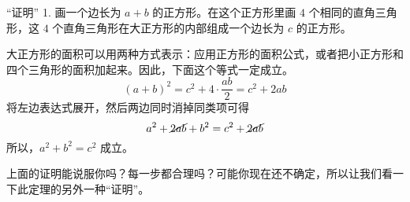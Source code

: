 \begin{proofs}{``证明'' 1.}
    画一个边长为 $a+b$ 的正方形。在这个正方形里画 $4$ 个相同的直角三角形，这 $4$ 个直角三角形在大正方形的内部组成一个边长为 $c$ 的正方形。

    \begin{center}
    \end{center}

    大正方形的面积可以用两种方式表示：应用正方形的面积公式，或者把小正方形和四个三角形的面积加起来。因此，下面这个等式一定成立。
    \[(a+b)^2=c^2+4\cdot\frac{ab}{2}=c^2+2ab\] 
    将左边表达式展开，然后两边同时消掉同类项可得 
    \[a^2+\cancel{2ab}+b^2=c^2+\cancel{2ab}\] 
    所以，$a^2+b^2=c^2$ 成立。
\end{proofs}

上面的证明能说服你吗？每一步都合理吗？可能你现在还不确定，所以让我们看一下此定理的另外一种``证明''。

